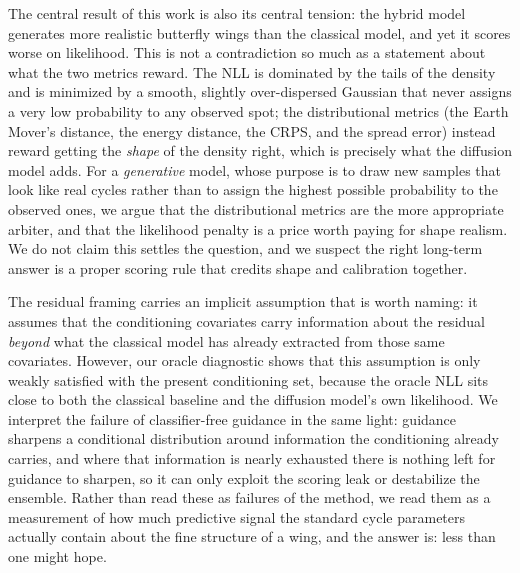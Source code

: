 \documentclass[twocolumn]{aastex631}
\begin{document}
The central result of this work is also its central tension: the hybrid model
generates more realistic butterfly wings than the classical model, and yet it
scores worse on likelihood. This is not a contradiction so much as a statement
about what the two metrics reward. The NLL is dominated by the tails of the
density and is minimized by a smooth, slightly over-dispersed Gaussian that never
assigns a very low probability to any observed spot; the distributional metrics
(the Earth Mover's distance, the energy distance, the CRPS, and the spread error)
instead reward getting the \emph{shape} of the density right, which is precisely
what the diffusion model adds. For a \emph{generative} model, whose purpose is to
draw new samples that look like real cycles rather than to assign the highest
possible probability to the observed ones, we argue that the distributional
metrics are the more appropriate arbiter, and that the likelihood penalty is a
price worth paying for shape realism. We do not claim this settles the question,
and we suspect the right long-term answer is a proper scoring rule that credits
shape and calibration together.

The residual framing carries an implicit assumption that is worth naming: it
assumes that the conditioning covariates carry information about the residual
\emph{beyond} what the classical model has already extracted from those same
covariates. However, our oracle diagnostic shows that this assumption is only
weakly satisfied with the present conditioning set, because the oracle NLL sits
close to
both the classical baseline and the diffusion model's own likelihood. We
interpret the failure of classifier-free guidance in the same light: guidance
sharpens a conditional distribution around information the conditioning already
carries, and where that information is nearly exhausted there is nothing left for
guidance to sharpen, so it can only exploit the scoring leak or destabilize the
ensemble. Rather than read these as failures of the method, we read them as a
measurement of how much predictive signal the standard cycle parameters actually
contain about the fine structure of a wing, and the answer is: less than one
might hope.
\end{document}
